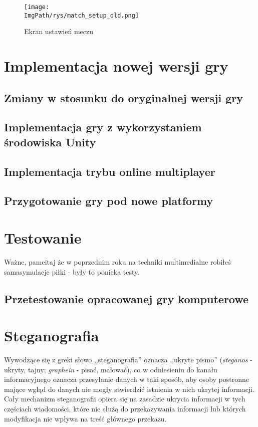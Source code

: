 \documentclass[a4paper,12pt,twoside,openany]{report}
\newcommand{\ImgPath}{.}
\begin{document}
\begin{figure}[!htbp]
	\begin{center}
\centering
\texttt{[image: \\ImgPath/rys/match\_setup\_old.png]}
\end{center}
	\caption{Ekran ustawień meczu}
	\label{match_setup_old}
\end{figure}


\chapter{Implementacja nowej wersji gry}

\section{Zmiany w stosunku do oryginalnej wersji gry}

\section{Implementacja gry z wykorzystaniem środowiska Unity}

\section{Implementacja trybu online multiplayer}

\section{Przygotowanie gry pod nowe platformy}

\chapter{Testowanie}


Ważne, pameitaj że w poprzednim roku na techniki multimedialne robiłeś samasymulacje piłki - były to ponieka testy.
\section{Przetestowanie opracowanej gry komputerowe}

\iffalse
\chapter{Steganografia}
Wywodzące się z greki słowo ,,steganografia'' oznacza ,,ukryte pismo'' 
(\textit{steganos} - ukryty, tajny; \textit{graphein} - pisać, malować), co w 
odniesieniu do kanału informacyjnego oznacza przesyłanie danych w taki sposób, 
aby osoby postronne mające wgląd do danych nie mogły stwierdzić istnienia w nich 
ukrytej informacji. Cały mechanizm steganografii opiera się na zasadzie ukrycia 
informacji w tych częściach wiadomości, które nie służą do przekazywania 
informacji lub których modyfikacja nie wpływa na treść głównego przekazu.
\end{document}
